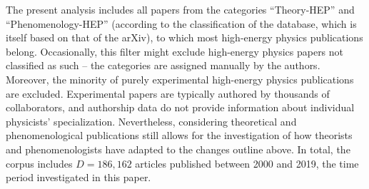 \documentclass{article}
\begin{document}
The present analysis includes all papers from the categories ``Theory-HEP'' and ``Phenomenology-HEP'' (according to the classification of the database, which is itself based on that of the arXiv), to which most high-energy physics publications belong. Occasionally, this filter might exclude high-energy physics papers not classified as such -- the categories are assigned manually by the authors. Moreover, the minority of purely experimental high-energy physics publications are excluded. Experimental papers are typically authored by thousands of collaborators, and authorship data do not provide information about individual physicists' specialization. Nevertheless, considering theoretical and phenomenological publications still allows for the investigation of how theorists and phenomenologists have adapted to the changes outline above. In total, the corpus includes $D=186,162$ articles published between 2000 and 2019, the time period investigated in this paper.
\end{document}
